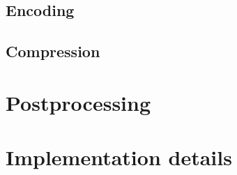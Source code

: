 




\subsection {Encoding}

\subsection {Compression}

\section{Postprocessing}
\label{sec:postprocessing}


\section{Implementation details}
\label{sec:implementation-details}

